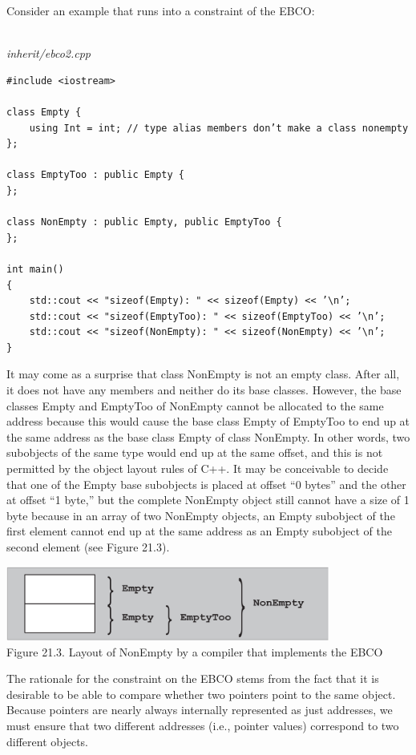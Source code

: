 Consider an example that runs into a constraint of the EBCO:

\hspace*{\fill} \\ %
\noindent
\textit{inherit/ebco2.cpp}
\begin{lstlisting}[style=styleCXX]
#include <iostream>

class Empty {
	using Int = int; // type alias members don’t make a class nonempty
};

class EmptyToo : public Empty {
};

class NonEmpty : public Empty, public EmptyToo {
};

int main()
{
	std::cout << "sizeof(Empty): " << sizeof(Empty) << ’\n’;
	std::cout << "sizeof(EmptyToo): " << sizeof(EmptyToo) << ’\n’;
	std::cout << "sizeof(NonEmpty): " << sizeof(NonEmpty) << ’\n’;
}
\end{lstlisting}

It may come as a surprise that class NonEmpty is not an empty class. After all, it does not have any members and neither do its base classes. However, the base classes Empty and EmptyToo of NonEmpty cannot be allocated to the same address because this would cause the base class Empty of EmptyToo to end up at the same address as the base class Empty of class NonEmpty. In other words, two subobjects of the same type would end up at the same offset, and this is not permitted by the object layout rules of C++. It may be conceivable to decide that one of the Empty base subobjects is placed at offset “0 bytes” and the other at offset “1 byte,” but the complete NonEmpty object still cannot have a size of 1 byte because in an array of two NonEmpty objects, an Empty subobject of the first element cannot end up at the same address as an Empty subobject of the second element (see Figure 21.3).

\begin{center}
\includegraphics[width=0.8\textwidth]{content/3/chapter21/images/3.png} \\
Figure 21.3. Layout of NonEmpty by a compiler that implements the EBCO
\end{center}

The rationale for the constraint on the EBCO stems from the fact that it is desirable to be able to compare whether two pointers point to the same object. Because pointers are nearly always internally represented as just addresses, we must ensure that two different addresses (i.e., pointer values) correspond to two different objects.


